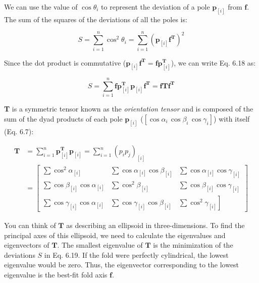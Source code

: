 \documentclass[a4paper , 12pt]{book}
\begin{document}
We can use the value of $\cos\theta_i$ to represent the deviation of a pole $\mathbf{p}_{[i]}$ from $\mathbf{f}$. The sum of the squares of the deviations of all the poles is:

\begin{equation}
    S=\sum_{i=1}^{n}\cos^2\theta_i=\sum_{i=1}^{n}\left(\mathbf{p}_{[i]}\mathbf{f^T}\right)^2
\end{equation}

Since the dot product is commutative ($\mathbf{p}_{[i]}\mathbf{f^T}=\mathbf{f}\mathbf{p}_{[i]}^{\mathbf{T}} $), we can write Eq. 6.18 as:

\begin{equation}
    S=\sum_{i=1}^{n}\mathbf{f}\mathbf{p}_{[i]}^{\mathbf{T}}\mathbf{p}_{[i]}\mathbf{f^T}=\mathbf{f}\mathbf{T}\mathbf{f^T}
\end{equation}

\textbf{T} is a symmetric tensor known as the \textit{orientation tensor} and is composed of the sum of the dyad products of each pole $\mathbf{p}_{[i]}$ ($[\cos\alpha_i\,\cos\beta_i\,\cos\gamma_i]$) with itself (Eq. 6.7):

\begin{equation}
    \begin{aligned} \mathbf{T} &=\sum_{i=1}^{n} \mathbf{p}_{[i]}^{\mathbf{T}}\mathbf{p}_{[i]}=\sum_{i=1}^{n}\left(p_{i}p_{j}\right)_{[i]} \\ 
    &=\left[\begin{array}{ccc}\sum \cos ^{2} \alpha_{[i]} & \sum \cos \alpha_{[i]} \cos \beta_{[i]} & \sum \cos \alpha_{[i]} \cos \gamma_{[i]} \\ \sum \cos \beta_{[i]} \cos \alpha_{[i]} & \sum \cos ^{2} \beta_{[i]} & \sum \cos \beta_{[i]} \cos \gamma_{[i]} \\ \sum \cos \gamma_{[i]} \cos \alpha_{[i]} & \sum \cos \gamma_{[i]} \cos \beta_{[i]} & \left.\sum \cos ^{2} \gamma_{[i]}\right]\end{array}\right] \end{aligned}
\end{equation}

You can think of $\mathbf{T}$ as describing an ellipsoid in three-dimensions. To find the principal axes of this ellipsoid, we need to calculate the eigenvalues and eigenvectors of $\mathbf{T}$. The smallest eigenvalue of $\mathbf{T}$ is the minimization of the deviations $S$ in Eq. 6.19. If the fold were perfectly cylindrical, the lowest eigenvalue would be zero. Thus, the eigenvector corresponding to the lowest eigenvalue is the best-fit fold axis $\mathbf{f}$.  
\end{document}
